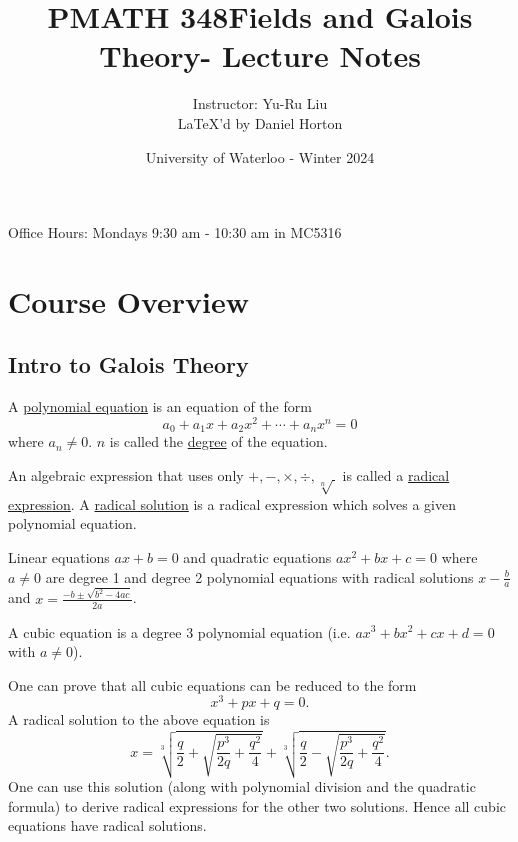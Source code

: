 \documentclass[11pt]{article}
\def\instructorname{Yu-Ru Liu}
\def\authorname{Daniel Horton}
\def\term{Winter 2024}
\def\coursecode{PMATH 348}
\def\coursename{Fields and Galois Theory}
\begin{document}
\thispagestyle{empty}
\title{\coursecode\space\coursename\space - Lecture Notes}
\author{Instructor: \instructorname \\ \LaTeX'd by \authorname}
\date{University of Waterloo - \term}
\maketitle
\pagebreak

Office Hours: Mondays 9:30 am - 10:30 am in MC5316
\tableofcontents
\pagebreak

\section{Course Overview}

\subsection{Intro to Galois Theory}

\begin{definition}
    A \ul{polynomial equation} is an equation of the form
    \[a_0+a_1x+a_2x^2+\cdots+a_nx^n=0\]
    where $a_n\neq0$. $n$ is called the \ul{degree} of the equation.
\end{definition}

\begin{definition}
    An algebraic expression that uses only $+,-,\times,\div,\sqrt[n]{\,}$ is {}called a \ul{radical expression}. A \ul{radical solution} is a radical expression which solves a given polynomial equation.
\end{definition}

\begin{example}
    Linear equations $ax+b=0$ and quadratic equations $ax^2+bx+c=0$ where $a\neq0$ are degree 1 and degree 2 polynomial equations with radical solutions $x-\frac{b}{a}$ and $x=\frac{-b\pm\sqrt{b^2-4ac}}{2a}$.
\end{example}

\begin{definition}
    A cubic equation is a degree 3 polynomial equation (i.e. $ax^3+bx^2+cx+d=0$ with $a\neq0$).
\end{definition}

\begin{note}
    One can prove that all cubic equations can be reduced to the form
    \[x^3+px+q=0.\]
    A radical solution to the above equation is
    \[x=\sqrt[3]{\frac q2+\sqrt{\frac{p^3}{2q}+\frac{q^2}{4}}}+\sqrt[3]{\frac q2-\sqrt{\frac{p^3}{2q}+\frac{q^2}{4}}}.\]
    One can use this solution (along with polynomial division and the quadratic formula) to derive radical expressions for the other two solutions. Hence all cubic equations have radical solutions.
\end{note}
\end{document}

